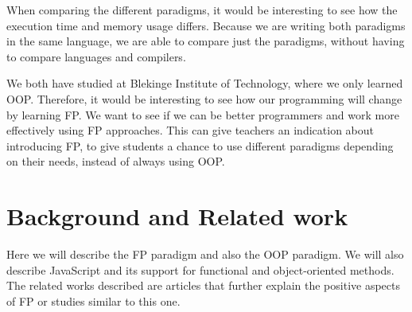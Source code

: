 \documentclass {article}
\begin{document}
When comparing the different paradigms, it would be interesting to see how the execution time and memory usage differs. Because we are writing both paradigms in the same language, we are able to compare just the paradigms, without having to compare languages and compilers.
 
We both have studied at Blekinge Institute of Technology, where we only learned OOP. Therefore, it would be interesting to see how our programming will change by learning FP. We want to see if we can be better programmers and work more effectively using FP approaches. This can give teachers an indication about introducing FP, to give students a chance to use different paradigms depending on their needs, instead of always using OOP.
\newpage 
\section{Background and Related work}
Here we will describe the FP paradigm and also the OOP paradigm. We will also describe JavaScript and its support for functional and object-oriented methods. The related works described are articles that further explain the positive aspects of FP or studies similar to this one.
\end{document}
